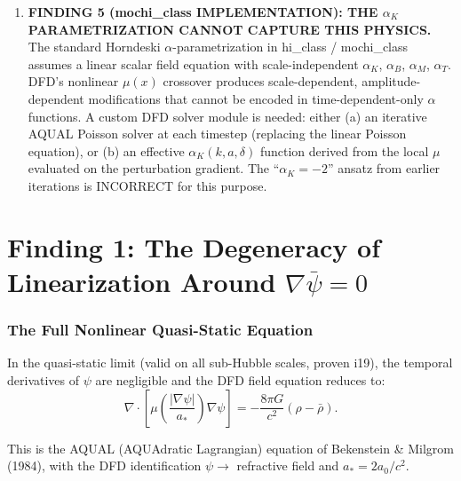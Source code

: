 \documentclass[11pt]{article}
\newcommand{\aM}{a_0}
\newcommand{\astar}{a_*}
\begin{document}
\begin{tcolorbox}[colback=blue!5!white, colframe=blue!70!black,
  title=\textbf{W4i20 TOP 5 FINDINGS --- THE $G_{\rm eff}$ RESOLUTION}]
\begin{enumerate}
\item \textbf{FINDING 5 (mochi\_class IMPLEMENTATION): THE $\alpha_K$
  PARAMETRIZATION CANNOT CAPTURE THIS PHYSICS.}
  The standard Horndeski $\alpha$-parametrization in hi\_class /
  mochi\_class assumes a linear scalar field equation with
  scale-independent $\alpha_K$, $\alpha_B$, $\alpha_M$, $\alpha_T$.
  DFD's nonlinear $\mu(x)$ crossover produces scale-dependent,
  amplitude-dependent modifications that cannot be encoded in
  time-dependent-only $\alpha$ functions. A custom DFD solver
  module is needed: either (a) an iterative AQUAL Poisson solver
  at each timestep (replacing the linear Poisson equation), or
  (b) an effective $\alpha_K(k, a, \delta)$ function derived from
  the local $\mu$ evaluated on the perturbation gradient.
  The ``$\alpha_K = -2$'' ansatz from earlier iterations is
  INCORRECT for this purpose.

\end{enumerate}
\end{tcolorbox}


\part{Finding 1: The Degeneracy of Linearization Around $\nabla\bar\psi = 0$}
\label{part:degeneracy}

\section{The Full Nonlinear Quasi-Static Equation}

In the quasi-static limit (valid on all sub-Hubble scales, proven i19),
the temporal derivatives of $\psi$ are negligible and the DFD field
equation reduces to:
\begin{equation}
\nabla\cdot\left[\mu\!\left(\frac{|\nabla\psi|}{\astar}\right)
\nabla\psi\right] = -\frac{8\pi G}{c^2}(\rho - \bar\rho).
\label{eq:AQUAL-full}
\end{equation}

This is the AQUAL (AQUAdratic Lagrangian) equation of Bekenstein \&
Milgrom (1984), with the DFD identification $\psi \to$ refractive field
and $\astar = 2\aM/c^2$.
\end{document}
